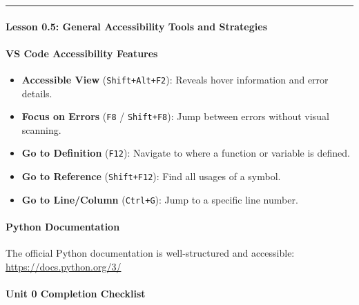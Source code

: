 \documentclass[
  justified,
  openright,
]{tufte-book}
\let\subsection\paragraph
\let\paragraph\paragraph
\let\subsection\paragraph
\let\paragraph\paragraph
\providecommand{\tightlist}{%
  \setlength{\itemsep}{0pt}\setlength{\parskip}{0pt}}
\begin{document}
\begin{center}\rule{0.5\linewidth}{0.5pt}\end{center}

\subsection{Lesson 0.5: General Accessibility Tools and
Strategies}\label{lesson-0.5-general-accessibility-tools-and-strategies}

\subsection{VS Code Accessibility
Features}\label{vs-code-accessibility-features}

\begin{itemize}
\tightlist
\item
  \textbf{Accessible View} (\texttt{Shift+Alt+F2}): Reveals hover
  information and error details.
\item
  \textbf{Focus on Errors} (\texttt{F8} / \texttt{Shift+F8}): Jump
  between errors without visual scanning.
\item
  \textbf{Go to Definition} (\texttt{F12}): Navigate to where a function
  or variable is defined.
\item
  \textbf{Go to Reference} (\texttt{Shift+F12}): Find all usages of a
  symbol.
\item
  \textbf{Go to Line/Column} (\texttt{Ctrl+G}): Jump to a specific line
  number.
\end{itemize}

\subsection{Python Documentation}\label{python-documentation}

The official Python documentation is well-structured and accessible:
\url{https://docs.python.org/3/}

\subsection{Unit 0 Completion
Checklist}\label{unit-0-completion-checklist}
\end{document}
